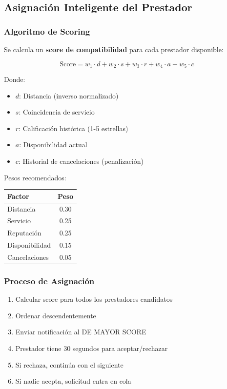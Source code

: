 \documentclass[12pt,a4paper,spanish]{article}
\begin{document}
\subsection{Asignación Inteligente del Prestador}

\subsubsection{Algoritmo de Scoring}

Se calcula un \textbf{score de compatibilidad} para cada prestador disponible:

\begin{equation}
    \text{Score} = w_1 \cdot d + w_2 \cdot s + w_3 \cdot r + w_4 \cdot a + w_5 \cdot c
\end{equation}

Donde:
\begin{itemize}
    \item $d$: Distancia (inverso normalizado)
    \item $s$: Coincidencia de servicio
    \item $r$: Calificación histórica (1-5 estrellas)
    \item $a$: Disponibilidad actual
    \item $c$: Historial de cancelaciones (penalización)
\end{itemize}

Pesos recomendados:
\begin{center}
\begin{tabular}{|l|c|}
    \toprule
    \textbf{Factor} & \textbf{Peso} \\
    \midrule
    Distancia & 0.30 \\
    Servicio & 0.25 \\
    Reputación & 0.25 \\
    Disponibilidad & 0.15 \\
    Cancelaciones & 0.05 \\
    \bottomrule
\end{tabular}
\end{center}

\subsubsection{Proceso de Asignación}

\begin{enumerate}
    \item Calcular score para todos los prestadores candidatos
    \item Ordenar descendentemente
    \item Enviar notificación al DE MAYOR SCORE
    \item Prestador tiene 30 segundos para aceptar/rechazar
    \item Si rechaza, continúa con el siguiente
    \item Si nadie acepta, solicitud entra en cola
\end{enumerate}
\end{document}
